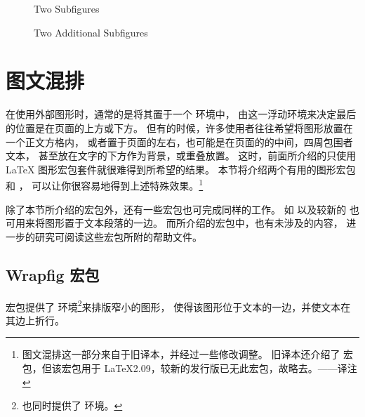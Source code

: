 \begin{figure}
	\centering
	\hspace{1cm}
	\caption{Two Subfigures}
	\label{fig:contfig:one}
\end{figure}
\begin{figure}
	\ContinuedFloat
	\centering
	\hspace{1cm}
	\caption{Two Additional Subfigures}
	\label{fig:contfig:two}
\end{figure}

\section{图文混排}\label{sec:figintext}

在使用外部图形时，通常的是将其置于一个  环境中，
由这一浮动环境来决定最后的位置是在页面的上方或下方。
但有的时候，许多使用者往往希望将图形放置在一个正文方格内，
或者置于页面的左右，也可能是在页面的的中间，四周包围者文本，
甚至放在文字的下方作为背景，或重叠放置。
这时，前面所介绍的只使用 \LaTeX{} 图形宏包套件就很难得到所希望的结果。
本节将介绍两个有用的图形宏包  和 ，
可以让你很容易地得到上述特殊效果。\footnote{
    图文混排这一部分来自于旧译本，并经过一些修改调整。
    旧译本还介绍了  宏包，但该宏包用于 \LaTeX2.09，较新的发行版已无此宏包，故略去。——译注}


除了本节所介绍的宏包外，还有一些宏包也可完成同样的工作。
如 \cite{floatflt-doc} 以及较新的\cite{cutwin-doc} 也可用来将图形置于文本段落的一边。
而所介绍的宏包中，也有未涉及的内容，
进一步的研究可阅读这些宏包所附的帮助文件。

\subsection{Wrapfig 宏包}\label{ssec:wrapfig}

 宏包提供了  环境\footnote{
	 也同时提供了  环境。}来排版窄小的图形，
使得该图形位于文本的一边，并使文本在其边上折行。

